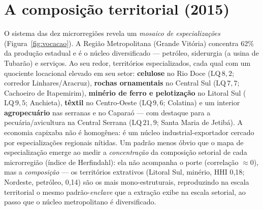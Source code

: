 \documentclass[11pt,a4paper]{article}
\begin{document}
\section{A composição territorial (2015)}
\label{sec:territorio}
O sistema das dez microrregiões revela um \emph{mosaico de especializações}
(Figura~\ref{fig:vocacao}). A Região Metropolitana (Grande Vitória) concentra 62\% da
produção estadual e é o núcleo diversificado --- petróleo, siderurgia (a usina de
Tubarão) e serviços. Ao seu redor, territórios especializados, cada qual com um
quociente locacional elevado em seu setor: \textbf{celulose} no Rio Doce
($\mathrm{LQ}\,8{,}2$; corredor Linhares/Aracruz), \textbf{rochas ornamentais} no
Central Sul ($\mathrm{LQ}\,7{,}7$; Cachoeiro de Itapemirim), \textbf{minério de ferro e
pelotização} no Litoral Sul ($\mathrm{LQ}\,9{,}5$; Anchieta), \textbf{têxtil} no
Centro-Oeste ($\mathrm{LQ}\,9{,}6$; Colatina) e um interior \textbf{agropecuário} nas
serranas e no Caparaó --- com destaque para a pecuária/avicultura na Central Serrana
($\mathrm{LQ}\,21{,}9$; Santa Maria de Jetibá). A economia capixaba não é homogênea: é
um núcleo industrial-exportador cercado por especializações regionais nítidas.
Um padrão menos óbvio que o mapa de especialização emerge ao medir a \emph{concentração}
da composição setorial de cada microrregião (índice de Herfindahl): ela não acompanha o
porte (correlação $\approx0$), mas a \emph{composição} --- os territórios extrativos (Litoral
Sul, minério, HHI 0,18; Nordeste, petróleo, 0,14) são os mais mono-estruturais, reproduzindo
na escala territorial o mesmo padrão-\emph{enclave} que a extração exibe na escala setorial,
ao passo que o núcleo metropolitano é diversificado.
\end{document}
